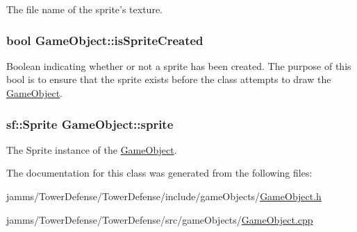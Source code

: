 The file name of the sprite's texture. 

\hypertarget{class_game_object_a677286bcb906871b6a3eb0c0b9342176}{
\subsubsection[{is\+Sprite\+Created}]{\setlength{\rightskip}{0pt plus 5cm}bool Game\+Object\+::is\+Sprite\+Created\hspace{0.3cm}{\ttfamily [protected]}}}\label{class_game_object_a677286bcb906871b6a3eb0c0b9342176}


Boolean indicating whether or not a sprite has been created. The purpose of this bool is to ensure that the sprite exists before the class attempts to draw the \hyperlink{class_game_object}{Game\+Object}. 

\hypertarget{class_game_object_abb3608f1c76edd590e023585c2216f02}{
\subsubsection[{sprite}]{\setlength{\rightskip}{0pt plus 5cm}sf\+::\+Sprite Game\+Object\+::sprite\hspace{0.3cm}{\ttfamily [protected]}}}\label{class_game_object_abb3608f1c76edd590e023585c2216f02}


The Sprite instance of the \hyperlink{class_game_object}{Game\+Object}. 



The documentation for this class was generated from the following files\+:\begin{DoxyCompactItemize}
\item 
jamms/\+Tower\+Defense/\+Tower\+Defense/include/game\+Objects/\hyperlink{_game_object_8h}{Game\+Object.\+h}\item 
jamms/\+Tower\+Defense/\+Tower\+Defense/src/game\+Objects/\hyperlink{_game_object_8cpp}{Game\+Object.\+cpp}\end{DoxyCompactItemize}
